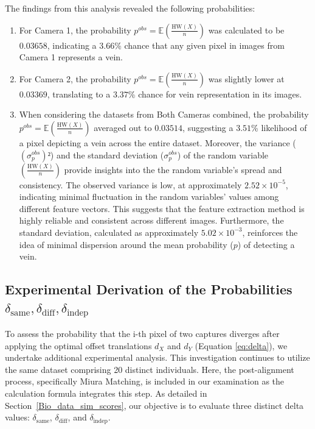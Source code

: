 The findings from this analysis revealed the following probabilities:
\begin{enumerate}
    \item For Camera 1, the probability \(p^{obs} = \mathbb{E}\left( \frac{\text{HW}(X)}{n} \right)\) was calculated to be \(0.03658\), indicating a \(3.66\)\% chance that any given pixel in images from Camera 1 represents a vein.

    \item For Camera 2, the probability \(p^{obs} = \mathbb{E}\left( \frac{\text{HW}(X)}{n} \right)\) was slightly lower at \(0.03369\), translating to a \(3.37\)\% chance for vein representation in its images.

    \item When considering the datasets from Both Cameras combined, the probability \(p^{obs} = \mathbb{E}\left( \frac{\text{HW}(X)}{n} \right)\) averaged out to \(0.03514\), suggesting a \(3.51\)\% likelihood of a pixel depicting a vein across the entire dataset. Moreover, the variance (\((\sigma^{obs}_p)²\)) and the standard deviation (\( \sigma^{obs}_p \)) of the random variable \(\left( \frac{\text{HW}(X)}{n} \right)\) provide insights into the the random variable's spread and consistency. The observed variance is low, at approximately \( 2.52 \times 10^{-5} \), indicating minimal fluctuation in the random variables' values among different feature vectors. This suggests that the feature extraction method is highly reliable and consistent across different images. Furthermore, the standard deviation, calculated as approximately \( 5.02 \times 10^{-3} \), reinforces the idea of minimal dispersion around the mean probability (\(p\)) of detecting a vein. 
    
\end{enumerate}

\subsection{Experimental Derivation of the Probabilities \(\delta_{\text{same}}, \delta_{\text{diff}}, \delta_{\text{indep}}\)}
\label{sec:delta}

To assess the probability that the i-th pixel of two captures diverges after applying the optimal offset translations \( d_X \) and \( d_Y \) (Equation \ref{eq:delta}), we undertake additional experimental analysis. This investigation continues to utilize the same dataset comprising 20 distinct individuals. Here, the post-alignment process, specifically Miura Matching, is included in our examination as the calculation formula integrates this step. As detailed in Section~\ref{Bio_data_sim_scores}, our objective is to evaluate three distinct delta values: \(\delta_{\text{same}}\), \(\delta_{\text{diff}}\), and  \(\delta_{\text{indep}}\).

